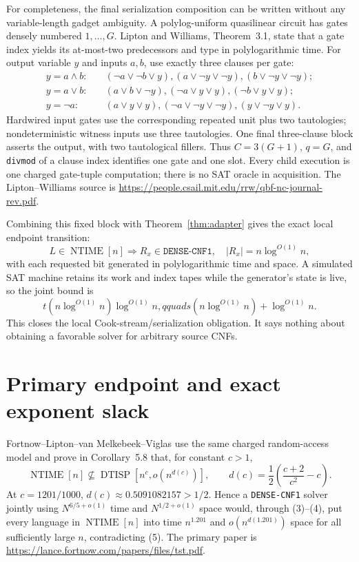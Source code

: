 \documentclass[11pt]{article}
\newcommand{\DTISP}{\operatorname{DTISP}}
\begin{document}
For completeness, the final serialization composition can be written without
any variable-length gadget ambiguity.  A polylog-uniform quasilinear circuit
has gates densely numbered $1,\dots,G$.  Lipton and Williams, Theorem~3.1,
state that a gate index yields its at-most-two predecessors and type in
polylogarithmic time.  For output variable $y$ and inputs $a,b$, use exactly
three clauses per gate:
\begin{align*}
 y=a\wedge b:&\quad
 (\neg a\vee\neg b\vee y),
 (a\vee\neg y\vee\neg y),
 (b\vee\neg y\vee\neg y);\\
 y=a\vee b:&\quad
 (a\vee b\vee\neg y),
 (\neg a\vee y\vee y),
 (\neg b\vee y\vee y);\\
 y=\neg a:&\quad
 (a\vee y\vee y),
 (\neg a\vee\neg y\vee\neg y),
 (y\vee\neg y\vee y).
\end{align*}
Hardwired input gates use the corresponding repeated unit plus two
tautologies; nondeterministic witness inputs use three tautologies.  One final
three-clause block asserts the output, with two tautological fillers.  Thus
$C=3(G+1)$, $q=G$, and \texttt{divmod} of a clause index identifies one gate
and one slot.  Every child execution is one charged gate-tuple computation;
there is no SAT oracle in acquisition.  The Lipton--Williams source is
\url{https://people.csail.mit.edu/rrw/qbf-nc-journal-rev.pdf}.

Combining this fixed block with Theorem~\ref{thm:adapter} gives the exact
local endpoint transition:
\[
 L\in\operatorname{NTIME}[n]
 \Longrightarrow R_x\in\texttt{DENSE-CNF1},\quad
 |R_x|=n\log^{O(1)}n,                                      \tag{3}
\]
with each requested bit generated in polylogarithmic time and space.  A
simulated SAT machine retains its work and index tapes while the generator's
state is live, so the joint bound is
\[
 t(n\log^{O(1)}n)\log^{O(1)}n,qquad
 s(n\log^{O(1)}n)+\log^{O(1)}n.                            \tag{4}
\]
This closes the local Cook-stream/serialization obligation.  It says nothing
about obtaining a favorable solver for arbitrary source CNFs.

\section{Primary endpoint and exact exponent slack}

Fortnow--Lipton--van Melkebeek--Viglas use the same charged random-access
model and prove in Corollary~5.8 that, for constant $c>1$,
\[
 \operatorname{NTIME}[n]\not\subseteq
 \DTISP\!\left[n^c,o\!\left(n^{d(c)}\right)\right],\qquad
 d(c)=\frac12\left(\frac{c+2}{c^2}-c\right).               \tag{5}
\]
At $c=1201/1000$, $d(c)\approx0.5091082157>1/2$.  Hence a
\texttt{DENSE-CNF1} solver jointly using $N^{6/5+o(1)}$ time and
$N^{1/2+o(1)}$ space would, through (3)--(4), put every language in
$\operatorname{NTIME}[n]$ into time $n^{1.201}$ and
$o(n^{d(1.201)})$ space for all sufficiently large $n$, contradicting (5).
The primary paper is
\url{https://lance.fortnow.com/papers/files/tst.pdf}.
\end{document}
